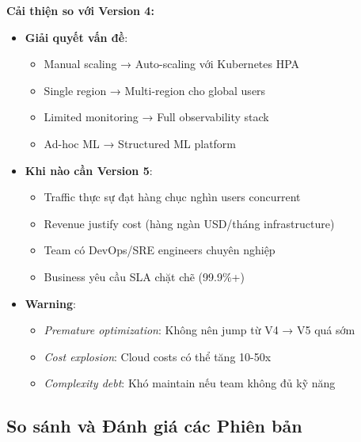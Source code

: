 \noindent\textbf{Cải thiện so với Version 4:}

\begin{itemize}
    \item \textbf{Giải quyết vấn đề}:
    \begin{itemize}
        \item Manual scaling → Auto-scaling với Kubernetes HPA
        \item Single region → Multi-region cho global users
        \item Limited monitoring → Full observability stack
        \item Ad-hoc ML → Structured ML platform
    \end{itemize}
    
    \item \textbf{Khi nào cần Version 5}:
    \begin{itemize}
        \item Traffic thực sự đạt hàng chục nghìn users concurrent
        \item Revenue justify cost (hàng ngàn USD/tháng infrastructure)
        \item Team có DevOps/SRE engineers chuyên nghiệp
        \item Business yêu cầu SLA chặt chẽ (99.9\%+)
    \end{itemize}
    
    \item \textbf{Warning}:
    \begin{itemize}
        \item \textit{Premature optimization}: Không nên jump từ V4 → V5 quá sớm
        \item \textit{Cost explosion}: Cloud costs có thể tăng 10-50x
        \item \textit{Complexity debt}: Khó maintain nếu team không đủ kỹ năng
    \end{itemize}
\end{itemize}

\subsection{So sánh và Đánh giá các Phiên bản}

